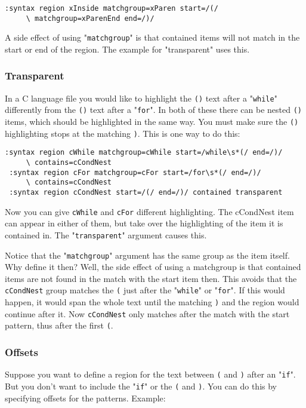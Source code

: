 \begin{Verbatim}[samepage=true]
 :syntax region xInside matchgroup=xParen start=/(/
     \ matchgroup=xParenEnd end=/)/
\end{Verbatim}

A side effect of using "\texttt{matchgroup}" is that contained items will not match in the start or end of the region.
The example for "transparent" uses this.

\subsubsection{Transparent}
In a C language file you would like to highlight the \texttt{()} text after a "\texttt{while}" differently from the \texttt{()} text after a "\texttt{for}".
In both of these there can be nested \texttt{()} items, which should be highlighted in the same way.
You must make sure the \texttt{()} highlighting stops at the matching \texttt{)}.
This is one way to do this:

\begin{Verbatim}[samepage=true]
 :syntax region cWhile matchgroup=cWhile start=/while\s*(/ end=/)/
     \ contains=cCondNest
 :syntax region cFor matchgroup=cFor start=/for\s*(/ end=/)/
     \ contains=cCondNest
 :syntax region cCondNest start=/(/ end=/)/ contained transparent
\end{Verbatim}

Now you can give \texttt{cWhile} and \texttt{cFor} different highlighting.
The cCondNest item can appear in either of them, but take over the highlighting of the item it is contained in.
The "\texttt{transparent}" argument causes this.

Notice that the "\texttt{matchgroup}" argument has the same group as the item itself.
Why define it then?  Well, the side effect of using a matchgroup is that contained items are not found in the match with the start item then.
This avoids that the \texttt{cCondNest} group matches the \texttt{(} just after the "\texttt{while}" or "\texttt{for}".
If this would happen, it would span the whole text until the matching \texttt{)} and the region would continue after it.
Now \texttt{cCondNest} only matches after the match with the start pattern, thus after the first \texttt{(}.

\subsubsection{Offsets}
Suppose you want to define a region for the text between \texttt{(} and \texttt{)} after an "\texttt{if}".
But you don't want to include the "\texttt{if}" or the \texttt{(} and \texttt{)}.
You can do this by specifying offsets for the patterns.
Example:

